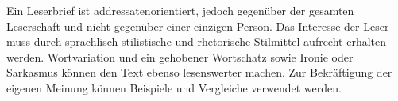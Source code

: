 
Ein Leserbrief ist addressatenorientiert, jedoch gegen\"{u}ber der gesamten Leserschaft und nicht gegen\"{u}ber einer einzigen Person. Das Interesse der Leser muss durch sprachlisch-stilistische und rhetorische Stilmittel aufrecht erhalten werden. Wortvariation und ein gehobener Wortschatz sowie Ironie oder Sarkasmus k\"{o}nnen den Text ebenso lesenswerter machen. Zur Bekr\"{a}ftigung der eigenen Meinung k\"{o}nnen Beispiele und Vergleiche verwendet werden.



